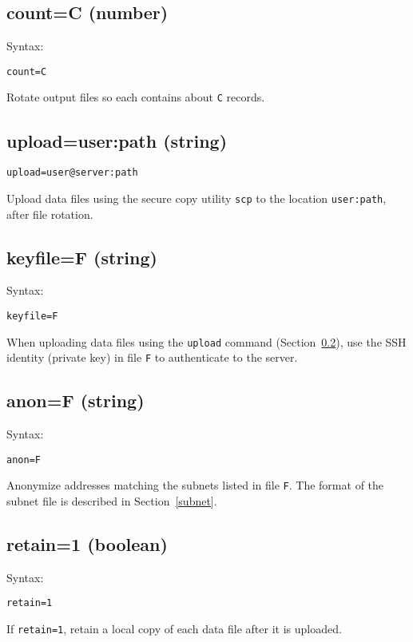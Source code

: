 \documentclass{book}
\begin{document}
\subsection{count=C (number)}
\label{count}
\begin{mdframed}[style=aaa]
Syntax:
  \begin{verbatim}
count=C
  \end{verbatim}
\end{mdframed}
Rotate output files so each contains about \texttt{C} records.  

\subsection{upload=user\@server:path (string)}
\label{upload}
\begin{mdframed}[style=aaa]
  \begin{verbatim}
upload=user@server:path    
  \end{verbatim}
\end{mdframed}
Upload data files using the secure copy utility \texttt{scp}
to the location \texttt{user\@server:path}, after file rotation.

\subsection{keyfile=F (string)}
\label{keyfile}
\begin{mdframed}[style=aaa]
Syntax:
  \begin{verbatim}
keyfile=F                  
  \end{verbatim}
\end{mdframed}
When uploading data files using the \texttt{upload} command (Section~\ref{upload}), use the
SSH identity (private key) in file \texttt{F} to authenticate to the
server.

\subsection{anon=F (string)}
\label{anon}
\begin{mdframed}[style=aaa]
Syntax:
  \begin{verbatim}
anon=F                     
  \end{verbatim}
\end{mdframed}
Anonymize addresses matching the subnets listed in file \texttt{F}.
The format of the subnet file is described in Section~\ref{subnet}.

\subsection{retain=1 (boolean)}
\label{retain}
\begin{mdframed}[style=aaa]
Syntax:
  \begin{verbatim}
retain=1                   
  \end{verbatim}
\end{mdframed}
If \texttt{retain=1}, retain a local copy of each data file after it
is uploaded.  
\end{document}
